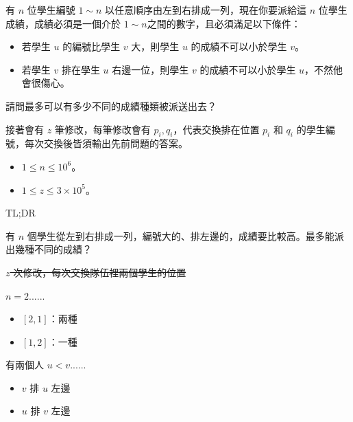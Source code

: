 \begin{frame}{}
    \begin{problem}
        有 $n$ 位學生編號 $1\sim n$ 以任意順序由左到右排成一列，現在你要派給這 $n$ 位學生成績，成績必須是一個介於 $1\sim n$之間的數字，且必須滿足以下條件：

        \begin{itemize}
            \item 若學生 $u$ 的編號比學生 $v$ 大，則學生 $u$ 的成績不可以小於學生 $v$。
            \item 若學生 $v$ 排在學生 $u$ 右邊一位，則學生 $v$ 的成績不可以小於學生 $u$，不然他會很傷心。
        \end{itemize}

            請問最多可以有多少不同的成績種類被派送出去？

            接著會有 $z$ 筆修改，每筆修改會有 $p_i,q_i$，代表交換排在位置 $p_i$ 和 $q_i$ 的學生編號，每次交換後皆須輸出先前問題的答案。
        \begin{itemize}
            \item $1\le n\le 10^6$。
            \item $1\le z\le 3\times10^5$。
        \end{itemize}
    \end{problem}
\end{frame}

\begin{frame}{}
    TL;DR

    有 $n$ 個學生從左到右排成一列，編號大的、排左邊的，成績要比較高。最多能派出幾種不同的成績？

     {
         \sout<3>{$z$ 次修改，每次交換隊伍裡兩個學生的位置}
    }
\end{frame}

\begin{frame}{}
    $n = 2$......

    \begin{itemize}
        \item $[2, 1]$：兩種
        \item $[1, 2]$：一種
    \end{itemize}
\end{frame}

\begin{frame}{}
    有兩個人 $u < v$......

    \begin{itemize}
        \item $v$ 排 $u$ 左邊
        \item $u$ 排 $v$ 左邊
    \end{itemize}
\end{frame}


